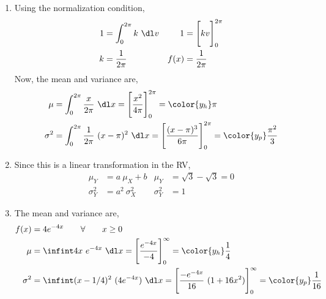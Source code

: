 \begin{enumerate}
    \item Using the normalization condition,
          \begin{align}
              1    & = \int_{0}^{2\pi} k\ \dl v  &
              1    & = \Bigg[ kv \Bigg]_0^{2\pi}   \\
              k    & = \frac{1}{2\pi}            &
              f(x) & = \frac{1}{2\pi}
          \end{align}
          Now, the mean and variance are,
          \begin{align}
              \mu      & = \int_{0}^{2\pi} \frac{x}{2\pi}\ \dl x
              = \Bigg[\frac{x^2}{4\pi}\Bigg]_0^{2\pi} = \color{y_h} \pi     \\
              \sigma^2 & = \int_{0}^{2\pi} \frac{1}{2\pi}\ (x-\pi)^2\ \dl x
              = \Bigg[ \frac{(x-\pi)^3}{6\pi} \Bigg]_0^{2\pi}
              = \color{y_p} \frac{\pi^2}{3}
          \end{align}

    \item Since this is a linear transformation in the RV,
          \begin{align}
              \mu_Y      & = a\ \mu_X + b    & \mu_Y      & = \sqrt{3} - \sqrt{3} = 0 \\
              \sigma^2_Y & = a^2\ \sigma^2_X & \sigma^2_Y & = 1
          \end{align}

    \item The mean and variance are,
          \begin{align}
              f(x)     & = 4e^{-4x} \qquad \forall \qquad x \geq 0                    \\
              \mu      & = \infint 4x\ e^{-4x}\ \dl x
              = \Bigg[ \frac{e^{-4x}}{-4} \Bigg]_0^{\infty} = \color{y_h} \frac{1}{4} \\
              \sigma^2 & = \infint (x-1/4)^2\ (4e^{-4x})\ \dl x
              = \Bigg[ \frac{-e^{-4x}}{16}\ (1 + 16x^2)  \Bigg]_0^{\infty}
              = \color{y_p} \frac{1}{16}
          \end{align}


\end{enumerate}
